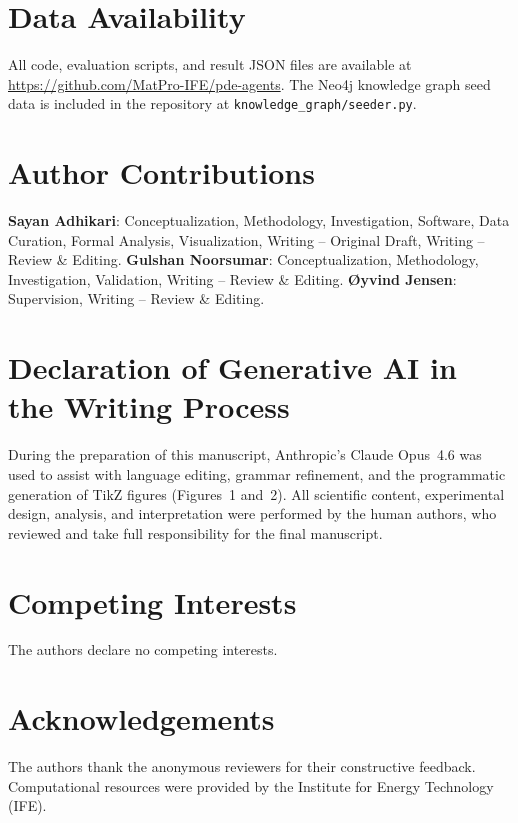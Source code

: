 \documentclass[twocolumn]{article}
\begin{document}
\section*{Data Availability}
All code, evaluation scripts, and result JSON files are available at
\url{https://github.com/MatPro-IFE/pde-agents}.  The Neo4j knowledge
graph seed data is included in the repository at \texttt{knowledge\_graph/seeder.py}.

\section*{Author Contributions}
\textbf{Sayan Adhikari}: Conceptualization, Methodology, Investigation, Software, Data Curation, Formal Analysis, Visualization, Writing -- Original Draft, Writing -- Review \& Editing.
\textbf{Gulshan Noorsumar}: Conceptualization, Methodology, Investigation, Validation, Writing -- Review \& Editing.
\textbf{\O yvind Jensen}: Supervision, Writing -- Review \& Editing.

\section*{Declaration of Generative AI in the Writing Process}
During the preparation of this manuscript, Anthropic's Claude Opus~4.6 was used to assist with language editing, grammar refinement, and the programmatic generation of TikZ figures (Figures~1 and~2).
All scientific content, experimental design, analysis, and interpretation were performed by the human authors, who reviewed and take full responsibility for the final manuscript.

\section*{Competing Interests}
The authors declare no competing interests.

\section*{Acknowledgements}
The authors thank the anonymous reviewers for their constructive feedback.
Computational resources were provided by the Institute for Energy Technology (IFE).



\end{document}
